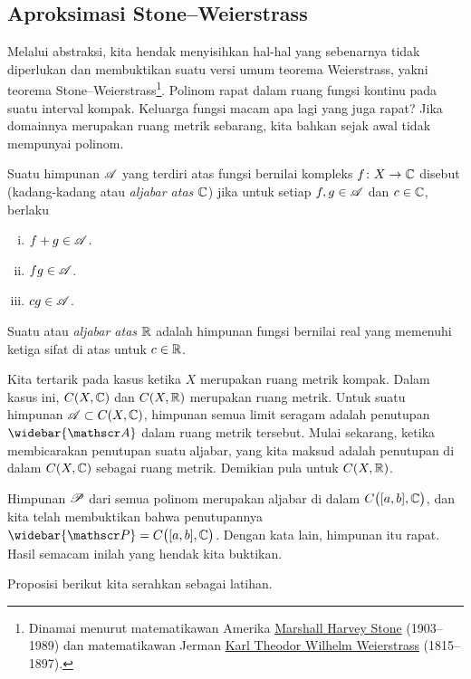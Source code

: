 \subsection{Aproksimasi Stone--Weierstrass}

Melalui abstraksi, kita hendak menyisihkan hal-hal yang sebenarnya tidak
diperlukan dan membuktikan suatu versi umum teorema Weierstrass, yakni teorema
Stone--Weierstrass\footnote{%
Dinamai menurut matematikawan Amerika
\href{https://en.wikipedia.org/wiki/Marshall_Harvey_Stone}{Marshall Harvey Stone}
(1903--1989) dan matematikawan Jerman
\href{https://en.wikipedia.org/wiki/Karl_Weierstrass}{Karl Theodor Wilhelm Weierstrass}
(1815--1897).}.
Polinom rapat dalam ruang fungsi kontinu pada suatu interval kompak. Keluarga
fungsi macam apa lagi yang juga rapat? Jika domainnya merupakan ruang metrik
sebarang, kita bahkan sejak awal tidak mempunyai polinom.

\begin{defn}
\pagebreak[2]
Suatu himpunan ${\mathscr{A}}$ yang terdiri atas fungsi bernilai kompleks
$f \colon X \to {\mathbb{C}}$ disebut \emph{} (kadang-kadang
\emph{} atau \emph{aljabar atas ${\mathbb{C}}$}) jika untuk
setiap $f,
g \in {\mathscr{A}}$ dan $c \in {\mathbb{C}}$, berlaku
\begin{enumerate}[(i)]
\item $f+g \in {\mathscr{A}}$.
\item $fg \in {\mathscr{A}}$.
\item $cg \in {\mathscr{A}}$.
\end{enumerate}
Suatu \emph{} atau \emph{aljabar atas ${\mathbb{R}}$} adalah
himpunan fungsi bernilai real yang memenuhi ketiga sifat di atas untuk
$c \in {\mathbb{R}}$.
\end{defn}

Kita tertarik pada kasus ketika $X$ merupakan ruang metrik kompak. Dalam kasus
ini, $C(X,{\mathbb{C}})$ dan $C(X,{\mathbb{R}})$ merupakan ruang metrik. Untuk suatu himpunan
${\mathscr{A}} \subset C(X,{\mathbb{C}})$, himpunan semua limit seragam adalah penutupan
$\widebar{\sA}$ dalam ruang metrik tersebut. Mulai sekarang, ketika membicarakan
penutupan suatu aljabar, yang kita maksud adalah penutupan di dalam $C(X,{\mathbb{C}})$
sebagai ruang metrik. Demikian pula untuk $C(X,{\mathbb{R}})$.

Himpunan ${\mathscr{P}}$ dari semua polinom merupakan aljabar di dalam
$C\bigl([a,b],{\mathbb{C}}\bigr)$, dan kita telah membuktikan bahwa penutupannya
$\widebar{\sP} = C\bigl([a,b],\C\bigr)$. Dengan kata lain, himpunan itu rapat.
Hasil semacam inilah yang hendak kita buktikan.

Proposisi berikut kita serahkan sebagai latihan.

